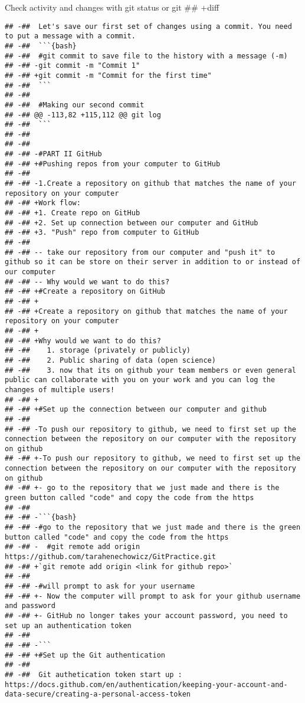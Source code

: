 \documentclass[ignorenonframetext,]{beamer}
\begin{document}
\begin{frame}[fragile]{Check activity and changes with git status or git
## +diff}
\begin{verbatim}
## -##  Let's save our first set of changes using a commit. You need to put a message with a commit.
## -##  ```{bash}
## -##  #git commit to save file to the history with a message (-m)
## -## -git commit -m "Commit 1"
## -## +git commit -m "Commit for the first time"
## -##  ```
## -##  
## -##  #Making our second commit
## -## @@ -113,82 +115,112 @@ git log
## -##  ```
## -##  
## -##  
## -## -#PART II GitHub
## -## +#Pushing repos from your computer to GitHub
## -##  
## -## -1.Create a repository on github that matches the name of your repository on your computer
## -## +Work flow: 
## -## +1. Create repo on GitHub
## -## +2. Set up connection between our computer and GitHub
## -## +3. "Push" repo from computer to GitHub
## -##  
## -## -- take our repository from our computer and "push it" to github so it can be store on their server in addition to or instead of our computer
## -## -- Why would we want to do this? 
## -## +#Create a repository on GitHub
## -## +
## -## +Create a repository on github that matches the name of your repository on your computer
## -## +
## -## +Why would we want to do this? 
## -##    1. storage (privately or publicly)
## -##    2. Public sharing of data (open science)
## -##    3. now that its on github your team members or even general public can collaborate with you on your work and you can log the changes of multiple users!
## -## +  
## -## +#Set up the connection between our computer and github
## -##  
## -## -To push our repository to github, we need to first set up the connection between the repository on our computer with the repository on github
## -## +-To push our repository to github, we need to first set up the connection between the repository on our computer with the repository on github
## -## +- go to the repository that we just made and there is the green button called "code" and copy the code from the https
## -##  
## -## -```{bash}
## -## -#go to the repository that we just made and there is the green button called "code" and copy the code from the https
## -## -  #git remote add origin https://github.com/tarahenechowicz/GitPractice.git
## -## +`git remote add origin <link for github repo>`
## -##  
## -## -#will prompt to ask for your username
## -## +- Now the computer will prompt to ask for your github username and password
## -## +- GitHub no longer takes your account password, you need to set up an authentication token
## -##  
## -## -```
## -## +#Set up the Git authentication 
## -##  
## -##  Git authetication token start up : https://docs.github.com/en/authentication/keeping-your-account-and-data-secure/creating-a-personal-access-token

\end{verbatim}
\end{frame}
\end{document}
